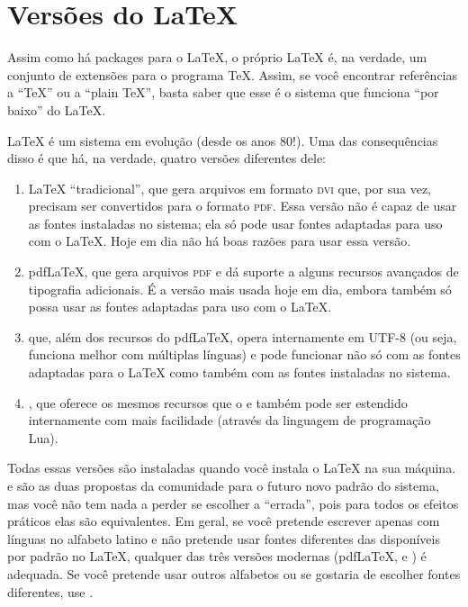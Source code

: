 \section{Versões do \LaTeX{}}
\label{sec:versions}

Assim como há packages para o \LaTeX{}, o próprio \LaTeX{} é, na verdade, um
conjunto de extensões para o programa \TeX{}. Assim, se você encontrar
referências a ``\TeX{}'' ou a ``plain \TeX{}'', basta saber que esse é o
sistema que funciona ``por baixo'' do \LaTeX{}.

\LaTeX{} é um sistema em evolução (desde os anos 80!). Uma das consequências
disso é que há, na verdade, quatro versões diferentes dele:

\begin{enumerate}
\item \LaTeX{} ``tradicional'', que gera arquivos em formato \textsc{dvi}
que, por sua vez, precisam ser convertidos para o formato \textsc{pdf}.
Essa versão não é capaz de usar as fontes instaladas no sistema; ela só
pode usar fontes adaptadas para uso com o \LaTeX{}. Hoje em dia não há
boas razões para usar essa versão.

\item pdf\LaTeX{}, que gera arquivos \textsc{pdf} e dá suporte a alguns
recursos avançados de tipografia adicionais. É a versão mais usada hoje
em dia, embora também só possa usar as fontes adaptadas para uso com o
\LaTeX{}.

\item \XeLaTeX{} que, além dos recursos do pdf\LaTeX{}, opera internamente
em UTF-8 (ou seja, funciona melhor com múltiplas línguas) e pode funcionar
não só com as fontes adaptadas para o \LaTeX{} como também com as fontes
instaladas no sistema.

\item \LuaLaTeX{}, que oferece os mesmos recursos que o \XeLaTeX{} e
também pode ser estendido internamente com mais facilidade (através da
linguagem de programação Lua).
\end{enumerate}

Todas essas versões são instaladas quando você instala o \LaTeX{} na sua
máquina. \XeLaTeX{} e \LuaLaTeX{} são as duas propostas da comunidade para
o futuro novo padrão do sistema, mas você não tem nada a perder se escolher
a ``errada'', pois para todos os efeitos práticos elas são equivalentes.
Em geral, se você pretende escrever apenas com línguas no alfabeto latino e
não pretende usar fontes diferentes das disponíveis por padrão no \LaTeX{},
qualquer das três versões modernas (pdf\LaTeX{}, \XeLaTeX{}
e \LuaLaTeX{}) é adequada. Se você pretende usar outros
alfabetos ou se gostaria de escolher fontes diferentes, use \LuaLaTeX{}.

